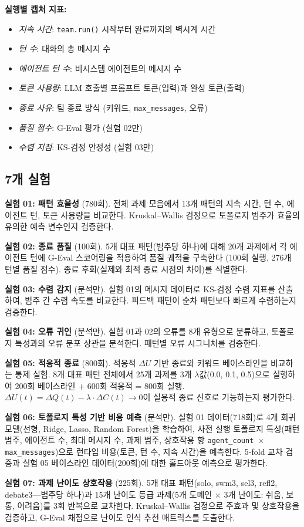 \documentclass[a4paper,11pt]{article}
\begin{document}
\textbf{실행별 캡처 지표:}
\begin{itemize}
    \item \emph{지속 시간}: \texttt{team.run()} 시작부터 완료까지의 벽시계 시간
    \item \emph{턴 수}: 대화의 총 메시지 수
    \item \emph{에이전트 턴 수}: 비시스템 에이전트의 메시지 수
    \item \emph{토큰 사용량}: LLM 호출별 프롬프트 토큰(입력)과 완성 토큰(출력)
    \item \emph{종료 사유}: 팀 종료 방식 (키워드, \texttt{max\_messages}, 오류)
    \item \emph{품질 점수}: G-Eval 평가 (실험 02만)
    \item \emph{수렴 지점}: KS-검정 안정성 (실험 03만)
\end{itemize}

\subsection{7개 실험}

\textbf{실험 01: 패턴 효율성} (780회). 전체 과제 모음에서 13개 패턴의 지속 시간, 턴 수, 에이전트 턴, 토큰 사용량을 비교한다. Kruskal--Wallis 검정으로 토폴로지 범주가 효율의 유의한 예측 변수인지 검증한다.

\textbf{실험 02: 종료 품질} (100회). 5개 대표 패턴(범주당 하나)에 대해 20개 과제에서 각 에이전트 턴에 G-Eval 스코어링을 적용하여 품질 궤적을 구축한다 (100회 실행, 276개 턴별 품질 점수). 종료 후회(실제와 최적 종료 시점의 차이)를 식별한다.

\textbf{실험 03: 수렴 감지} (분석만). 실험 01의 메시지 데이터로 KS-검정 수렴 지표를 산출하여, 범주 간 수렴 속도를 비교한다. 피드백 패턴이 순차 패턴보다 빠르게 수렴하는지 검증한다.

\textbf{실험 04: 오류 귀인} (분석만). 실험 01과 02의 오류를 8개 유형으로 분류하고, 토폴로지 특성과의 오류 분포 상관을 분석한다. 패턴별 오류 시그니처를 검증한다.

\textbf{실험 05: 적응적 종료} (800회). 적응적 $\Delta U$ 기반 종료와 키워드 베이스라인을 비교하는 통제 실험. 8개 대표 패턴 전체에서 25개 과제를 3개 $\lambda$값(0.0, 0.1, 0.5)으로 실행하여 200회 베이스라인 + 600회 적응적 = 800회 실행. $\Delta U(t) = \Delta Q(t) - \lambda \cdot \Delta C(t) \to 0$이 실용적 종료 신호로 기능하는지 평가한다.

\textbf{실험 06: 토폴로지 특성 기반 비용 예측} (분석만). 실험 01 데이터(718회)로 4개 회귀 모델(선형, Ridge, Lasso, Random Forest)을 학습하여, 사전 실행 토폴로지 특성(패턴 범주, 에이전트 수, 최대 메시지 수, 과제 범주, 상호작용 항 \texttt{agent\_count $\times$ max\_messages})으로 런타임 비용(토큰, 턴 수, 지속 시간)을 예측한다. 5-fold 교차 검증과 실험 05 베이스라인 데이터(200회)에 대한 홀드아웃 예측으로 평가한다.

\textbf{실험 07: 과제 난이도 상호작용} (225회). 5개 대표 패턴(solo, swm3, sel3, refl2, debate3---범주당 하나)과 15개 난이도 등급 과제(5개 도메인 $\times$ 3개 난이도: 쉬움, 보통, 어려움)를 3회 반복으로 교차한다. Kruskal--Wallis 검정으로 주효과 및 상호작용을 검증하고, G-Eval 채점으로 난이도 인식 추천 매트릭스를 도출한다.
\end{document}
